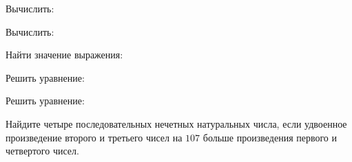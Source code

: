 \begin{listofex}
	\item Вычислить:
	\begin{enumcols}[itemcolumns=2]
		\item {}
		\item {}
		\item {}
		\item {}
		\item {}
		\item {}
	\end{enumcols}
	\item Вычислить:
	\begin{enumcols}[itemcolumns=2]
		\item {}
		\item {}
		\item {}
		\item {}
	\end{enumcols}
	\item Найти значение выражения:
	\begin{enumcols}[itemcolumns=2]
		\item {}
		\item {}
		\item {}
		\item {}
	\end{enumcols}
	\item Решить уравнение:
	\begin{enumcols}[itemcolumns=2]
		\item {}
		\item {}
		\item {}
		\item {}
		\item {}
	\end{enumcols}
	\item Решить уравнение:
	\begin{enumcols}[itemcolumns=2]
		\item {}
		\item {}
	\end{enumcols}
	\item Найдите четыре последовательных нечетных натуральных числа, если удвоенное
	произведение второго и третьего чисел на \( 107 \) больше произведения первого и четвертого
	чисел.
\end{listofex}
